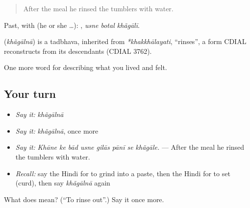 \begin{quote}
After the meal he rinsed the tumblers with water.
\end{quote}

Past, with  (he or she …):   , \emph{usne botal khãgālī}.

\begin{cousinweb}
\textbf{} (\emph{khãgālnā}) is a tadbhava, inherited from \emph{*khakkhālayati}, \textquotedblleft{}rinses\textquotedblright{}, a form CDIAL reconstructs from its descendants (CDIAL 3762).
\end{cousinweb}

\begin{grammarlens}[title={What you've built}]
One more word for describing what you lived and felt.
\end{grammarlens}

\subsection*{Your turn}
\begin{itemize}
\raggedright
  \item \emph{Say it:} \emph{khãgālnā}
  \item \emph{Say it:} \emph{khãgālnā}, once more
  \item \emph{Say it:} \emph{Khāne ke bād usne gilās pānī se khãgāle.} — After the meal he rinsed the tumblers with water.
  \item \emph{Recall:} say the Hindi for to grind into a paste, then the Hindi for to set (curd), then say \emph{khãgālnā} again
\end{itemize}

\begin{tcolorbox}[breakable,colback=teal!4,colframe=teal!35!black,title={Before you move on}]
What does  mean? (\textquotedblleft{}To rinse out\textquotedblright{}.) Say it once more.
\end{tcolorbox}
